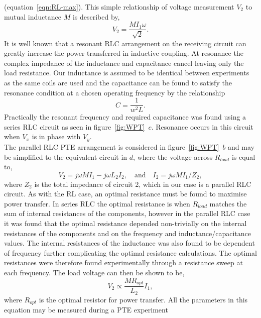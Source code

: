 \documentclass[11pt]{iopart}
\begin{document}
(equation~\ref{eqn:RL-max}). This simple relationship of voltage
measurement $V_2$ to mutual inductance $M$ is described by,
\begin{equation}
  V_2 = \frac{MI_1\omega}{\sqrt{2}}.
\label{eqn:MVs}
\end{equation}
It is well known that a resonant RLC arrangement on the receiving
circuit can greatly increase the power transferred in inductive
coupling\cite{}.  At resonance the complex impedance of the inductance
and capacitance cancel leaving only the load resistance. Our
inductance is assumed to be identical between experiments as the same
coils are used and the capacitance can be found to satisfy the
resonance condition at a chosen operating frequency by the
relationship
\begin{equation}
  C = \frac{1}{w^2L}.
  \label{eqn:RLC-res}
\end{equation}
Practically the resonant frequency and required capacitance was found
using a series RLC circuit as seen in
figure~\ref{fig:WPT}~$c$. Resonance occurs in this circuit when $V_x$
is in phase with $V_y$.\\
The parallel RLC PTE arrangement is considered in
figure~\ref{fig:WPT}~$b$ and may be simplified to the equivalent
circuit in $d$, where the voltage across $R_{load}$ is equal to,
\begin{equation}
 V_2 = j\omega MI_1 - j\omega L_2I_2,\quad\text{and}\quad
 I_2 = j\omega MI_1 / Z_2 ,
\end{equation}
where $Z_2$ is the total impedance of circuit 2, which in our case is
a parallel RLC circuit.  As with the RL case, an optimal resistance
must be found to
maximise power transfer. In series RLC the optimal resistance is when
$R_{load}$ matches the sum of internal resistances of the components,
however in the parallel RLC case it was found that the optimal
resistance depended non-trivially on the internal resistances of the
components and on the frequency and inductance/capacitance values. The
internal resistances of the inductance was also found to be dependent
of frequency further complicating the optimal resistance calculations.
The optimal resistances were therefore found experimentally
through a resistance sweep at each frequency.
The load voltage can then be shown to be,
\begin{equation}
    V_2 \propto \frac{MR_{opt}}{L_2}I_1,
\label{eqn:RLC-M}
\end{equation}
where $R_{opt}$ is the optimal resistor for power transfer. All the
parameters in this equation may be measured during a PTE experiment
\end{document}
